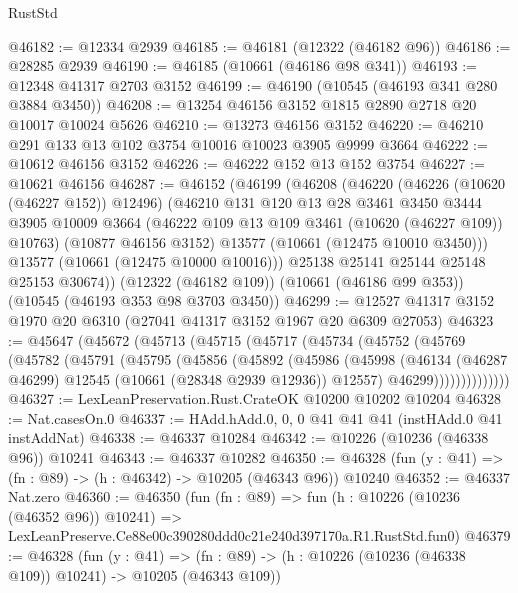 \begin{lexlean}{RustStd}
\begin{coremodule}
@46182 := @12334 @2939
@46185 := @46181 (@12322 (@46182 @96))
@46186 := @28285 @2939
@46190 := @46185 (@10661 (@46186 @98 @341))
@46193 := @12348 @41317 @2703 @3152
@46199 := @46190 (@10545 (@46193 @341 @280 @3884 @3450))
@46208 := @13254 @46156 @3152 @1815 @2890 @2718 @20 @10017 @10024 @5626
@46210 := @13273 @46156 @3152
@46220 := @46210 @291 @133 @13 @102 @3754 @10016 @10023 @3905 @9999 @3664
@46222 := @10612 @46156 @3152
@46226 := @46222 @152 @13 @152 @3754
@46227 := @10621 @46156
@46287 := @46152
    (@46199
      (@46208
        (@46220
          (@46226 (@10620 (@46227 @152)) @12496)
          (@46210
            @131
            @120
            @13
            @28
            @3461
            @3450
            @3444
            @3905
            @10009
            @3664
            (@46222 @109 @13 @109 @3461 (@10620 (@46227 @109)) @10763)
            (@10877 @46156 @3152)
            @13577
            (@10661 (@12475 @10010 @3450)))
          @13577
          (@10661 (@12475 @10000 @10016)))
        @25138
        @25141
        @25144
        @25148
        @25153
        @30674))
    (@12322 (@46182 @109))
    (@10661 (@46186 @99 @353))
    (@10545 (@46193 @353 @98 @3703 @3450))
@46299 := @12527 @41317 @3152 @1970 @20 @6310 (@27041 @41317 @3152 @1967 @20 @6309 @27053)
@46323 := @45647
    (@45672
      (@45713
        (@45715
          (@45717
            (@45734
              (@45752
                (@45769
                  (@45782
                    (@45791
                      (@45795
                        (@45856
                          (@45892
                            (@45986
                              (@45998
                                (@46134
                                  (@46287 @46299)
                                  @12545
                                  (@10661 (@28348 @2939 @12936))
                                  @12557)
                                @46299))))))))))))))
@46327 := LexLeanPreservation.Rust.CrateOK @10200 @10202 @10204
@46328 := Nat.casesOn.{0}
@46337 := HAdd.hAdd.{0, 0, 0} @41 @41 @41 (instHAdd.{0} @41 instAddNat)
@46338 := @46337 @10284
@46342 := @10226 (@10236 (@46338 @96)) @10241
@46343 := @46337 @10282
@46350 := @46328 (fun (y : @41) => (fn : @89) -> (h : @46342) -> @10205 (@46343 @96)) @10240
@46352 := @46337 Nat.zero
@46360 := @46350
    (fun (fn : @89) =>
    fun (h : @10226 (@10236 (@46352 @96)) @10241) =>
    LexLeanPreserve.Ce88e00c390280ddd0c21e240d397170a.R1.RustStd.fun0)
@46379 := @46328
    (fun (y : @41) =>
    (fn : @89) -> (h : @10226 (@10236 (@46338 @109)) @10241) -> @10205 (@46343 @109))

\end{coremodule}
\end{lexlean}
